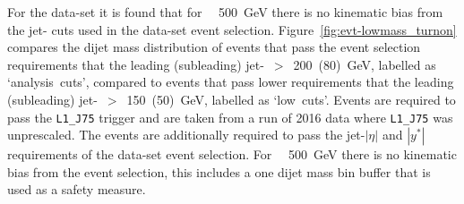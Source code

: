 
For the \lm{} data-set it is found that for \mjj~\gt~500~GeV there is no kinematic bias
from the jet-\pT{} cuts used in the \lm{} data-set event selection.
Figure~\ref{fig:evt-lowmass_turnon} compares the dijet mass distribution of events
that pass the event selection requirements that the leading (subleading) jet-\pT{}~$>$~200~(80)~GeV, labelled as `analysis~cuts',
compared to events that pass lower requirements that the leading (subleading) jet-\pT{}~$>$~150~(50)~GeV, labelled as `low~cuts'.
Events are required to pass the \verb|L1_J75| trigger and are taken from a run of 2016 data where \verb|L1_J75| was unprescaled.
The events are additionally required to pass the jet-$|\eta|$ and $|y^*|$ requirements of the \lm{} data-set event selection.
For \mjj~\gt~500~GeV there is no kinematic bias from the \lm{} event selection,
this includes a one dijet mass bin buffer that is used as a safety measure.




